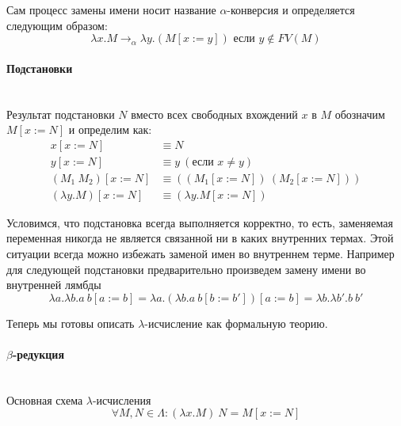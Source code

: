 \documentclass[lambda.tex]{subfiles}
\begin{document}
Сам процесс замены имени носит название $\alpha$-конверсия и определяется следующим образом:
\begin{equation*}
\lambda x.M \rightarrow_\alpha \lambda y.(M[x := y]) \text { если } y \not\in FV(M)\tag{$\alpha$}
\end{equation*}


\paragraph{Подстановки} %
\label{par:substitution}
~\\
Результат подстановки $N$ вместо всех свободных вхождений $x$ в $M$ обозначим $M[x := N]$ и определим как:
\begin{align*}
x[x := N] &\equiv N\\
y[x := N] &\equiv y\ (\text{если } x \neq y)\\
(M_1 \ M_2 )[x := N] &\equiv ((M_1 [x := N])\ (M_2 [x := N]))\\
(\lambda y.M)[x := N] &\equiv (\lambda y.M[x := N])
\end{align*}

\begin{tcolorbox}

Условимся, что подстановка всегда выполняется корректно, то есть, заменяемая переменная никогда не является связанной ни в каких внутренних термах. Этой ситуации всегда можно избежать заменой имен во внутреннем терме. Например для следующей подстановки предварительно произведем замену имени во внутренней лямбды
\[\lambda a.\lambda b.a\ b[a := b] = \lambda a.(\lambda b.a\ b[b := b'])[a := b] = \lambda b.\lambda b'.b\ b'\]


\end{tcolorbox}


Теперь мы готовы описать $\lambda$-исчисление как формальную теорию.\\

\paragraph{$\beta$-редукция} %
\label{par:beta reduction}
~\\
Основная схема $\lambda$-исчисления
\begin{equation*}
\forall M, N \in \Lambda : (\lambda x.M)\ N = M[x := N]\tag{$\beta$}
\end{equation*}
\end{document}
